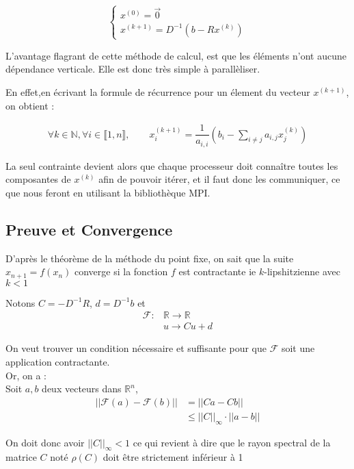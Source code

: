 \documentclass[11pt, a4paper]{article}
\begin{document}
\[
    \left\{
    \begin{array}{l}
        x^{(0)} = \vec{0}\\
        x^{(k+1)} = D^{-1}( b - Rx^{(k)})
    \end{array}
    \right.
\]

L'avantage flagrant de cette méthode de calcul, est que les éléments n'ont aucune dépendance verticale. Elle est donc très simple à parallèliser. 

En effet,en écrivant la formule de récurrence pour un élement du vecteur $x^{(k+1)}$, on obtient :

\begin{align}
    \forall k \in \mathbb{N}, \forall i \in \llbracket 1,n \rrbracket, 
    \qquad x_{i}^{(k+1)} = \dfrac{1}{a_{i,i}}(b_i - \sum_{i \neq j}a_{i,j} x^{(k)}_j)
\end{align}

La seul contrainte devient alors que chaque processeur doit conna\^itre toutes les composantes de $x^{(k)}$ afin de pouvoir itérer, et il faut donc les communiquer, ce que nous feront en utilisant la bibliothèque MPI.

\subsection{Preuve et Convergence}

D'après le théorème de la méthode du point fixe, on sait que la suite $x_{n+1} = f(x_n)$ converge si la fonction $f$ est contractante ie $k$-lipshitzienne avec $k < 1$

Notons $C = -D^{-1}R$, $d = D^{-1}b$ et 
\begin{align*}
    \mathcal{F} : &\mathbb{R} \longrightarrow \mathbb{R} \\
    &u \longrightarrow Cu + d
\end{align*}

On veut trouver un condition nécessaire et suffisante pour que $\mathcal{F}$ soit une application contractante.\\
Or, on a :\\

Soit $a,b$ deux vecteurs dans $\mathbb{R}^n$,\\
\begin{align*}
    ||\mathcal{F}(a) - \mathcal{F}(b)|| &= ||Ca - Cb||\\
    &\leq||C||_{\infty} \cdot ||a-b||
\end{align*}

On doit donc avoir $||C||_{\infty} < 1$ ce qui revient à dire que le rayon spectral de la matrice $C$ noté $\rho(C)$ doit \^etre strictement inférieur à 1
\end{document}
